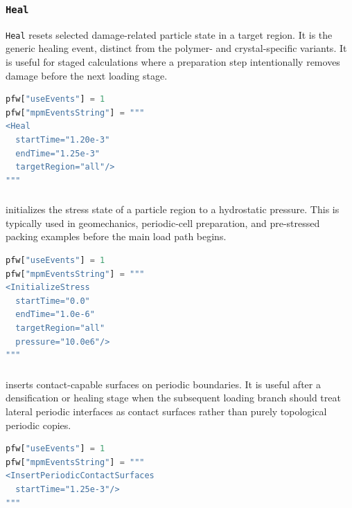 \subsubsection{\texttt{Heal}}

\texttt{Heal} resets selected damage-related particle state in a target region.  It is the generic healing event, distinct from the polymer- and crystal-specific variants.  It is useful for staged calculations where a preparation step intentionally removes damage before the next loading stage.

\begin{lstlisting}[language=Python,caption={Generic heal event.}]
pfw["useEvents"] = 1
pfw["mpmEventsString"] = """
<Heal
  startTime="1.20e-3"
  endTime="1.25e-3"
  targetRegion="all"/>
"""
\end{lstlisting}

\subsubsection{}

 initializes the stress state of a particle region to a hydrostatic pressure.  This is typically used in geomechanics, periodic-cell preparation, and pre-stressed packing examples before the main load path begins.

\begin{lstlisting}[language=Python,caption={Hydrostatic stress initialization event.}]
pfw["useEvents"] = 1
pfw["mpmEventsString"] = """
<InitializeStress
  startTime="0.0"
  endTime="1.0e-6"
  targetRegion="all"
  pressure="10.0e6"/>
"""
\end{lstlisting}

\subsubsection{}

 inserts contact-capable surfaces on periodic boundaries.  It is useful after a densification or healing stage when the subsequent loading branch should treat lateral periodic interfaces as contact surfaces rather than purely topological periodic copies.

\begin{lstlisting}[language=Python,caption={Periodic-contact-surface insertion event.}]
pfw["useEvents"] = 1
pfw["mpmEventsString"] = """
<InsertPeriodicContactSurfaces
  startTime="1.25e-3"/>
"""
\end{lstlisting}

